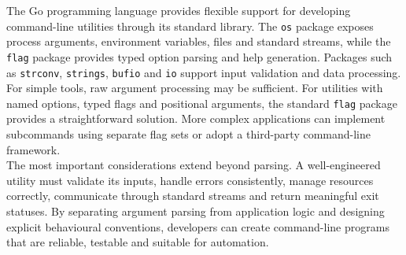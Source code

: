 The Go programming language provides flexible support for developing command-line utilities through its standard library. The \texttt{os} package exposes process arguments, environment variables, files and standard streams, while the \texttt{flag} package provides typed option parsing and help generation. Packages such as \texttt{strconv}, \texttt{strings}, \texttt{bufio} and \texttt{io} support input validation and data processing.\\

For simple tools, raw argument processing may be sufficient. For utilities with named options, typed flags and positional arguments, the standard \texttt{flag} package provides a straightforward solution. More complex applications can implement subcommands using separate flag sets or adopt a third-party command-line framework.\\

The most important considerations extend beyond parsing. A well-engineered utility must validate its inputs, handle errors consistently, manage resources correctly, communicate through standard streams and return meaningful exit statuses. By separating argument parsing from application logic and designing explicit behavioural conventions, developers can create command-line programs that are reliable, testable and suitable for automation.